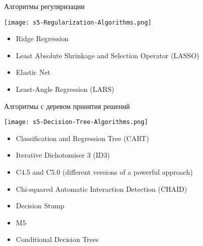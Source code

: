 \documentclass[pdf, intlimits, 9pt, unicode]{beamer}
\begin{document}

\begin{frame}{Алгоритмы регуляризации}

\begin{center}\texttt{[image: s5-Regularization-Algorithms.png]}\end{center}

\begin{itemize}
\item Ridge Regression
\item Least Absolute Shrinkage and Selection Operator (LASSO)
\item Elastic Net
\item Least-Angle Regression (LARS)
\end{itemize}

\end{frame}





\begin{frame}{Алгоритмы с деревом принятия решений}

\begin{center}\texttt{[image: s5-Decision-Tree-Algorithms.png]}\end{center}

\begin{itemize}
\item Classification and Regression Tree (CART)
\item Iterative Dichotomiser 3 (ID3)
\item C4.5 and C5.0 (different versions of a powerful approach)
\item Chi-squared Automatic Interaction Detection (CHAID)
\item Decision Stump
\item M5
\item Conditional Decision Trees
\end{itemize}

\end{frame}
\end{document}
